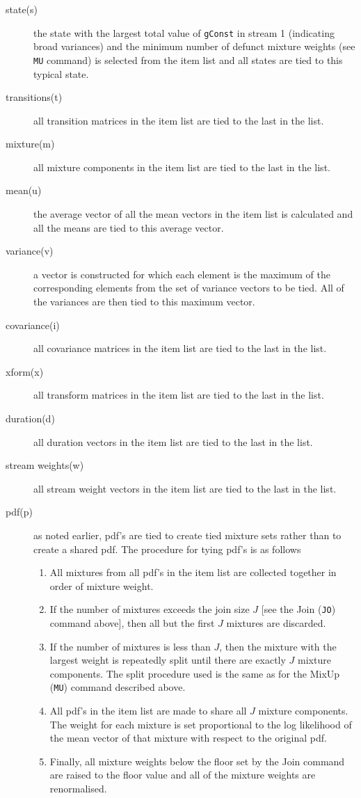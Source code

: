 \begin{description}
   \item[state(s)] the state with the largest total value of \texttt{gConst}
     in stream 1 (indicating broad variances) and the minimum number of
     defunct mixture weights (see \texttt{MU} command) is selected from the
   item list and all states are tied to this typical state.
   \item[transitions(t)] all transition matrices in the item list are
     tied to the last in the list.
   \item[mixture(m)] all mixture components in the item list are tied
   to the last in the list.
   \item[mean(u)] the average vector of all the mean vectors
   in the item list is calculated and all the means are tied to this
   average vector.
   \item[variance(v)] a vector is constructed for which each element
   is the maximum of the corresponding elements from the set of 
   variance vectors to be tied.  All of the variances are then tied
   to this maximum vector.
   \item[covariance(i)] all covariance matrices in the item list are tied
   to the last in the list.
   \item[xform(x)] all transform matrices in the item list are tied
   to the last in the list.
   \item[duration(d)] all duration vectors in the item list are tied
   to the last in the list.
   \item[stream weights(w)] all stream weight vectors in the item 
   list are tied to the last in the list.
   \item[pdf(p)]  as noted earlier, pdf's are tied to create tied
   mixture sets rather than to create a shared pdf.  The procedure
   for tying pdf's is as follows
   \begin{enumerate}
      \item All mixtures from all pdf's in the item list are collected 
       together in order of mixture weight.
      \item If the number of mixtures exceeds the join size $J$ [see the
       Join (\texttt{JO}) command above], then all but the first $J$ mixtures
       are discarded.
      \item If the number of mixtures is less than $J$, then the
       mixture with the largest weight is repeatedly split until
       there are exactly $J$ mixture components.  The split procedure
       used is the same as for the MixUp (\texttt{MU}) command
       described above.
      \item All pdf's in the item list are made to share all $J$
       mixture components.  The weight for each mixture is set
       proportional to the log likelihood of the mean vector of
       that mixture with respect to the original pdf.      
      \item Finally, all mixture weights below the floor set by the
       Join command are raised to the floor value and all of the
       mixture weights are renormalised.
   \end{enumerate}
\end{description}

